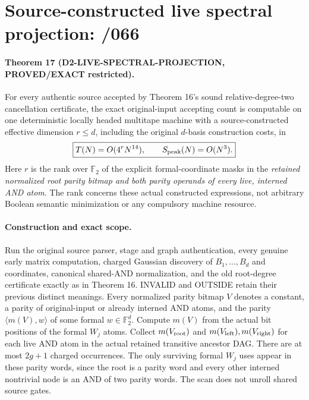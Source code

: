\documentclass[11pt]{article}
\begin{document}
\section{Source-constructed live spectral projection: /066}
\paragraph{Theorem 17 (D2-LIVE-SPECTRAL-PROJECTION, PROVED/EXACT restricted).}
For every authentic source accepted by Theorem 16's sound
relative-degree-two cancellation certificate, the exact original-input
accepting count is computable on one deterministic locally headed
multitape machine with a source-constructed effective dimension
$r\le d$, including the original $d$-basis construction costs, in
\[
\boxed{T(N)=O(4^rN^{14}),\qquad S_{\rm peak}(N)=O(N^3).}
\]
Here $r$ is the rank over $\mathbb F_2$ of the explicit formal-coordinate
masks in the \emph{retained normalized root parity bitmap and both parity
operands of every live, interned AND atom}. The rank concerns these
actual constructed expressions, not arbitrary Boolean semantic
minimization or any compulsory machine resource.

\paragraph{Construction and exact scope.}
Run the original source parser, stage and graph authentication, every
genuine early matrix computation, charged Gaussian discovery of
$B_1,\ldots,B_d$ and coordinates, canonical shared-AND normalization,
and the old root-degree certificate exactly as in Theorem 16.
INVALID and OUTSIDE retain their previous distinct meanings.
Every normalized parity bitmap $V$ denotes a constant, a parity of
original-input or already interned AND atoms, and the parity
$\langle m(V),w\rangle$ of some formal $w\in\mathbb F_2^d$.
Compute $m(V)$ from the actual bit positions of the formal $W_j$
atoms. Collect $m(V_{\rm root})$ and $m(V_{\rm left}),m(V_{\rm right})$
for each live AND atom in the actual retained transitive ancestor DAG.
There are at most $2g+1$ charged occurrences. The only surviving
formal $W_j$ uses appear in these parity words, since the root is a
parity word and every other interned nontrivial node is an AND of two
parity words. The scan does not unroll shared source gates.
\end{document}
